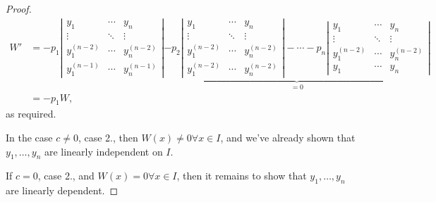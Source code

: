 \begin{proof}
\begin{align*}
    W' &= - p_1 \left| \begin{matrix}
        y_1 & \cdots &  y_n\\
        \vdots & \ddots & \vdots \\
        y_1^{(n-2)} & \cdots & y_n^{(n-2)}\\
        y_1^{(n-1)} & \cdots & y_n^{(n-1)}
    \end{matrix}\right|\underbrace{-p_2 \left|\begin{matrix}
        y_1 & \cdots &  y_n\\
        \vdots & \ddots & \vdots \\
        y_1^{(n-2)} & \cdots & y_n^{(n-2)}\\
        y_1^{(n-2)} & \cdots & y_n^{(n-2)}
    \end{matrix}\right| - \cdots - p_n\left|\begin{matrix}
        y_1 & \cdots &  y_n\\
        \vdots & \ddots & \vdots \\
        y_1^{(n-2)} & \cdots & y_n^{(n-2)}\\
        y_1 & \cdots & y_n
    \end{matrix}\right|}_{=0}\\
    &= -p_1 W,
\end{align*}
as required.

In the case $c \neq 0$, case 2., then $W(x) \neq 0 \forall x \in I$, and we've already shown that $y_1, \dots, y_n$ are linearly independent on $I$.

If $c = 0$, case 2., and $W(x) = 0 \forall x \in I$, then it remains to show that $y_1, \dots, y_n$ are linearly dependent.


\end{proof}
